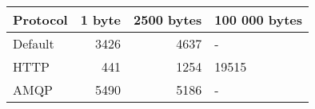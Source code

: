 \begin{tabularx}{\textwidth}{lrrl}
\hline
 Protocol   &   1 byte &   2500 bytes & 100 000 bytes   \\
\hline
 Default    &     3426 &         4637 & -               \\
 HTTP       &      441 &         1254 & 19515           \\
 AMQP       &     5490 &         5186 & -               \\
\hline
\end{tabularx}